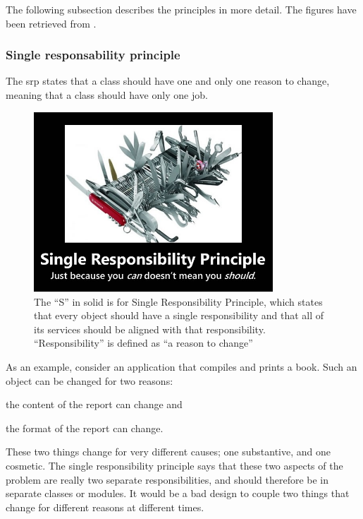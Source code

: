 The following subsection describes the principles in more detail. The figures have been retrieved from \cite{Devilla2009}.

\subsubsection{Single responsability principle }
\begin{framed}
The \gls{srp} states that a class should have one and only one reason to change, meaning that a class should have only one job.	
\end{framed}

\begin{figure}
	\centering
	\includegraphics[width=0.8\textwidth]{images/kotlin/SRP.jpg}
	\caption{The “S” in \gls{solid} is for Single Responsibility Principle, which states that every object should have a single responsibility and that all of its services should be aligned with that responsibility. “Responsibility” is defined as “a reason to change”}
	\label{fir:SRP}
\end{figure}
As an example, consider an application that compiles and prints a book. Such an object can be changed for two reasons: \begin{inparaenum}[(i)]
	\item the content of the report can change and
	\item the format of the report can change.
\end{inparaenum}
 These two things change for very different causes; one substantive, and one cosmetic. The single responsibility principle says that these two aspects of the problem are really two separate responsibilities, and should therefore be in separate classes or modules. It would be a bad design to couple two things that change for different reasons at different times.

